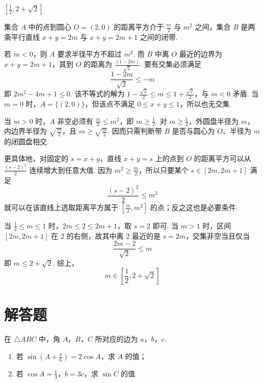 \begin{answer}
\(\left[\frac{1}{2},2+\sqrt{2}\right]\)
\end{answer}

\begin{solution}
集合 \(A\) 中的点到圆心 \(O=(2,0)\) 的距离平方介于 \(\frac{m}{2}\) 与 \(m^2\) 之间，集合 \(B\) 是两条平行直线 \(x+y=2m\) 与 \(x+y=2m+1\) 之间的闭带.

若 \(m<0\)，则 \(A\) 要求半径平方不超过 \(m^2\). 而 \(B\) 中离 \(O\) 最近的边界为 \(x+y=2m+1\)，其到 \(O\) 的距离为 \(\frac{(1-2m)}{\sqrt2}\). 要有交集必须满足
\[
\frac{1-2m}{\sqrt2}\leqslant -m
\]
即 \(2m^2-4m+1\leqslant0\). 该不等式的解为 \(1-\frac{\sqrt2}{2}\leqslant m\leqslant1+\frac{\sqrt2}{2}\)，与 \(m<0\) 矛盾. 当 \(m=0\) 时，\(A=\{(2,0)\}\)，但该点不满足 \(0\leqslant x+y\leqslant1\)，所以也无交集.

当 \(m>0\) 时，\(A\) 非空必须有 \(\frac{m}{2}\leqslant m^2\)，即 \(m\geqslant\frac{1}{2}\). 对 \(m\geqslant\frac{1}{2}\)，外圆盘半径为 \(m\)，内边界半径为 \(\sqrt{\frac{m}{2}}\)，且 \(m\geqslant\sqrt{\frac{m}{2}}\). 因而只需判断带 \(B\) 是否与圆心为 \(O\)、半径为 \(m\) 的闭圆盘相交.

更具体地，对固定的 \(s=x+y\)，直线 \(x+y=s\) 上的点到 \(O\) 的距离平方可以从 \(\frac{(s-2)^2}{2}\) 连续增大到任意大值. 因为 \(m^2\geqslant \frac{m}{2}\)，所以只要某个 \(s\in[2m,2m+1]\) 满足
\[
\frac{(s-2)^2}{2}\leqslant m^2
\]
就可以在该直线上选取距离平方属于 \([\frac{m}{2},m^2]\) 的点；反之这也是必要条件.

当 \(\frac{1}{2}\leqslant m\leqslant1\) 时，\(2m\leqslant2\leqslant2m+1\)，取 \(s=2\) 即可. 当 \(m>1\) 时，区间 \([2m,2m+1]\) 在 \(2\) 的右侧，故其中离 \(2\) 最近的是 \(s=2m\)，交集非空当且仅当
\[
\frac{2m-2}{\sqrt2}\leqslant m
\]
即 \(m\leqslant2+\sqrt2\). 综上，
\[
m\in\left[\frac12,2+\sqrt2\right]
\]
\end{solution}

\section{解答题}

\begin{problem}
在 \(\triangle ABC\) 中，角 \(A\)，\(B\)，\(C\) 所对应的边为 \(a\)，\(b\)，\(c\).
\begin{enumerate}
\item 若 \(\sin\left(A+\frac{\pi}{6}\right)=2\cos A\)，求 \(A\) 的值；
\item 若 \(\cos A=\frac{1}{3}\)，\(b=3c\)，求 \(\sin C\) 的值.
\end{enumerate}
\end{problem}

